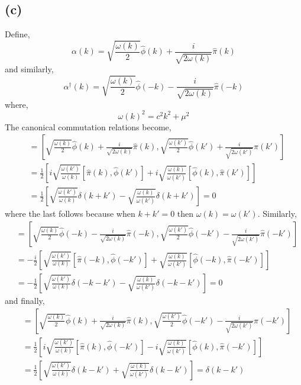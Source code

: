 \documentclass[12pt]{extarticle}
\begin{document}
\subsection*{(c)}
Define,
\[ \alpha(k) = \sqrt{\frac{\omega(k)}{2}} \hat{\phi}(k) + \frac{i}{\sqrt{2 \omega(k)}} \hat{\pi}(k)\]
and similarly,
\[ \alpha^\dagger(k) = \sqrt{\frac{\omega(k)}{2}} \hat{\phi}(-k) - \frac{i}{\sqrt{2 \omega(k)}} \hat{\pi}(-k)\]
where,
\[\omega(k)^2 = c^2 k^2 + \mu^2\]
The canonical commutation relations become,
\begin{align*}
[\alpha(k), \alpha(k')] & = \left[\sqrt{\frac{\omega(k)}{2}} \hat{\phi}(k) + \frac{i}{\sqrt{2 \omega(k)}} \hat{\pi}(k), \sqrt{\frac{\omega(k')}{2}} \hat{\phi}(k') + \frac{i}{\sqrt{2 \omega(k')}} \hat{\pi}(k') \right] 
\\
& = \frac{1}{2} \left[ i\sqrt{\frac{\omega(k')}{\omega(k)}} [\hat{\pi}(k), \hat{\phi}(k')] + i \sqrt{\frac{\omega(k)}{\omega(k')}} [\hat{\phi}(k), \hat{\pi}(k')] \right]
\\
& =  \frac{1}{2} \left[ \sqrt{\frac{\omega(k')}{\omega(k)}} \delta(k + k') -  \sqrt{\frac{\omega(k)}{\omega(k')}} \delta(k + k')  \right] = 0
\end{align*}
where the last follows because when $k + k' = 0$ then $\omega(k) = \omega(k')$. 
Similarly,
\begin{align*}
[\alpha^\dagger(k), \alpha^\dagger(k')] & = \left[\sqrt{\frac{\omega(k)}{2}} \hat{\phi}(-k) - \frac{i}{\sqrt{2 \omega(k)}} \hat{\pi}(-k), \sqrt{\frac{\omega(k')}{2}} \hat{\phi}(-k') - \frac{i}{\sqrt{2 \omega(k')}} \hat{\pi}(-k') \right] 
\\
& = -\frac{i}{2} \left[\sqrt{\frac{\omega(k')}{\omega(k)}} [\hat{\pi}(-k), \hat{\phi}(-k')] + \sqrt{\frac{\omega(k)}{\omega(k')}} [\hat{\phi}(-k), \hat{\pi}(-k')]\right]
\\
& = -\frac{1}{2} \left[ \sqrt{\frac{\omega(k')}{\omega(k)}} \delta(-k - k') - \sqrt{\frac{\omega(k)}{\omega(k')}} \delta(-k - k')\right] = 0
\end{align*}
and finally,
\begin{align*}
[\alpha(k), \alpha^\dagger(k')] & = \left[\sqrt{\frac{\omega(k)}{2}} \hat{\phi}(k) + \frac{i}{\sqrt{2 \omega(k)}} \hat{\pi}(k), \sqrt{\frac{\omega(k')}{2}} \hat{\phi}(-k') - \frac{i}{\sqrt{2 \omega(k')}} \hat{\pi}(-k') \right] 
\\
& = \frac{1}{2} \left[i \sqrt{\frac{\omega(k')}{\omega(k)}} [\hat{\pi}(k), \hat{\phi}(-k')] - i \sqrt{\frac{\omega(k)}{\omega(k')}} [\hat{\phi}(k), \hat{\pi}(-k')]\right]
\\
& = \frac{1}{2} \left[ \sqrt{\frac{\omega(k')}{\omega(k)}} \delta(k - k') + \sqrt{\frac{\omega(k)}{\omega(k')}} \delta(k - k')\right] = \delta(k - k')
\end{align*}
\end{document}
